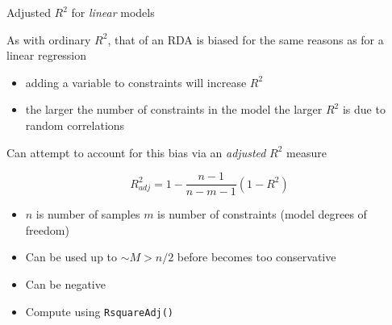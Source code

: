 \documentclass[10pt,ignorenonframetext,compress, aspectratio=169]{beamer}
\begin{document}
\begin{frame}{Adjusted \(R^2\) for \emph{linear} models}

As with ordinary \(R^2\), that of an RDA is biased for the same reasons
as for a linear regression

\begin{itemize}
\itemsep1pt\parskip0pt
\item
  adding a variable to constraints will increase \(R^2\)
\item
  the larger the number of constraints in the model the larger \(R^2\)
  is due to random correlations
\end{itemize}

Can attempt to account for this bias via an \emph{adjusted} \(R^2\)
measure

\[R^2_{adj} = 1 - \frac{n - 1}{n - m - 1}(1 - R^2)\]

\begin{itemize}
\itemsep1pt\parskip0pt
\item
  \(n\) is number of samples \(m\) is number of constraints (model
  degrees of freedom)
\item
  Can be used up to \(\sim M > n/2\) before becomes too conservative
\item
  Can be negative
\item
  Compute using \texttt{RsquareAdj()}
\end{itemize}

\end{frame}
\end{document}
